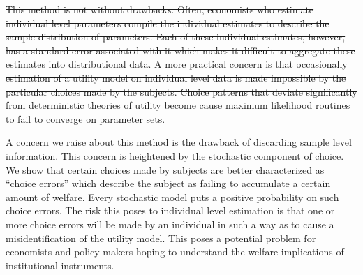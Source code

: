 \documentclass[11pt,a4paper]{report}
\providecommand{\DIFdeltex}[1]{{\protect\color{red}\sout{#1}}}                      %
\providecommand{\DIFdelbegin}{} %
\providecommand{\DIFdelend}{} %
\providecommand{\DIFdel}[1]{\texorpdfstring{\DIFdeltex{#1}}{}} %
\newcommand{\DIFscaledelfig}{0.5}
\newlength{\DIFdelgraphicswidth} %
\newlength{\DIFdelgraphicsheight} %
\newcommand{\DIFdelincludegraphics}[2][]{%
\sbox{\DIFdelgraphicsbox}{\DIFOincludegraphics[#1]{#2}}%
\settoboxwidth{\DIFdelgraphicswidth}{\DIFdelgraphicsbox} %
\settoboxtotalheight{\DIFdelgraphicsheight}{\DIFdelgraphicsbox} %
\scalebox{\DIFscaledelfig}{%
\parbox[b]{\DIFdelgraphicswidth}{\usebox{\DIFdelgraphicsbox}\\[-\baselineskip] \rule{\DIFdelgraphicswidth}{0em}}\llap{\resizebox{\DIFdelgraphicswidth}{\DIFdelgraphicsheight}{%
\setlength{\unitlength}{\DIFdelgraphicswidth}%
\begin{picture}(1,1)%
\thicklines\linethickness{2pt} %
{\color[rgb]{1,0,0}\put(0,0){\framebox(1,1){}}}%
{\color[rgb]{1,0,0}\put(0,0){\line( 1,1){1}}}%
{\color[rgb]{1,0,0}\put(0,1){\line(1,-1){1}}}%
\end{picture}%
}\hspace*{3pt}}} %
} %
\DeclareRobustCommand{\DIFdelbegin}{\DIFOdelbegin \let\includegraphics\DIFdelincludegraphics} %
\DeclareRobustCommand{\DIFdelend}{\DIFOaddend \let\includegraphics\DIFOincludegraphics} %
\begin{document}
\DIFdelbegin \DIFdel{This method is not without drawbacks.
Often, economists who estimate individual level parameters compile the individual estimates to describe the sample distribution of parameters.
Each of these individual estimates, however, has a standard error associated with it which makes it difficult to aggregate these estimates into distributional data.
A more practical concern is that occasionally estimation of a utility model on individual level data is made impossible by the particular choices made by the subjects.
Choice patterns that deviate significantly from deterministic theories of utility become cause maximum likelihood routines to fail to converge on parameter sets.
}\DIFdelend %

A concern we raise about this method is the drawback of discarding sample level information.
This concern is heightened by the stochastic component of choice.
We show that certain choices made by subjects are better characterized as \enquote{choice errors} which describe the subject as failing to accumulate a certain amount of welfare.
Every stochastic model puts a positive probability on such choice errors.
The risk this poses to individual level estimation is that one or more choice errors will be made by an individual in such a way as to cause a misidentification of the utility model.
This poses a potential problem for economists and policy makers hoping to understand the welfare implications of institutional instruments.
\end{document}
